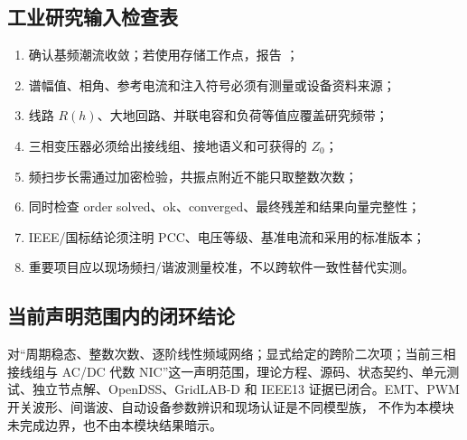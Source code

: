 \subsection{工业研究输入检查表}
\begin{enumerate}
  \item 确认基频潮流收敛；若使用存储工作点，报告 ；
  \item 谱幅值、相角、参考电流和注入符号必须有测量或设备资料来源；
  \item 线路 $R(h)$、大地回路、并联电容和负荷等值应覆盖研究频带；
  \item 三相变压器必须给出接线组、接地语义和可获得的 $Z_0$；
  \item 频扫步长需通过加密检验，共振点附近不能只取整数次数；
  \item 同时检查 order solved、ok、converged、最终残差和结果向量完整性；
  \item IEEE/国标结论须注明 PCC、电压等级、基准电流和采用的标准版本；
  \item 重要项目应以现场频扫/谐波测量校准，不以跨软件一致性替代实测。
\end{enumerate}

\subsection{当前声明范围内的闭环结论}
对“周期稳态、整数次数、逐阶线性频域网络；显式给定的跨阶二次项；当前三相接线组与 AC/DC
代数 NIC”这一声明范围，理论方程、源码、状态契约、单元测试、独立节点解、OpenDSS、GridLAB-D
和 IEEE13 证据已闭合。EMT、PWM 开关波形、间谐波、自动设备参数辨识和现场认证是不同模型族，
不作为本模块未完成边界，也不由本模块结果暗示。
